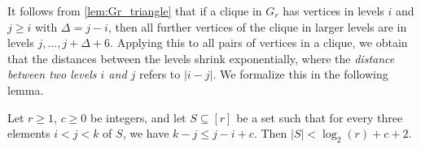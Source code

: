 \documentclass[a4paper,english,cleveref,thm-restate]{lipics-v2021}
\begin{document}
    

It follows from \cref{lem:Gr_triangle} that if a clique in $G_r$ has vertices in levels $ i $ and $ j \geq i $ with $ \Delta = j - i $, then all further vertices of the clique in larger levels are in levels $ j, \dots, j + \Delta + 6 $.
Applying this to all pairs of vertices in a clique, we obtain that the distances between the levels shrink exponentially, where the \emph{distance between two levels $ i $ and $ j $} refers to $ |i - j| $.
We formalize this in the following lemma.

\begin{lemma}\label{lem:Gr_clique-levels}
    Let $ r \geq 1 $, $ c \geq 0 $ be integers, and let $ S \subseteq [r] $ be a set such that for every three elements $ i < j < k $ of $ S $, we have $ k - j \leq j - i + c $.
    Then $ |S| < \log_2(r) + c + 2 $.
\end{lemma}
\end{document}
